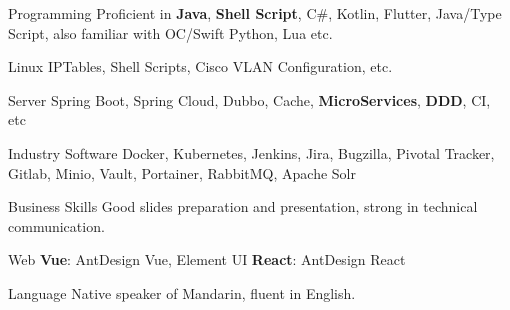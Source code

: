 

\begin{cvskills}

  \cvskill
    {Programming} %
    {Proficient in \textbf{Java},  \textbf{Shell Script}, {C\#}, {Kotlin}, {Flutter}, {Java/Type Script}, also familiar with {OC/Swift} {Python}, Lua etc.} %


  \cvskill
    {Linux} %
    {{IPTables}, {Shell Scripts}, {Cisco VLAN Configuration},   etc. } %


  \cvskill
    {Server} %
    {Spring Boot, Spring Cloud, Dubbo, Cache, \textbf{MicroServices}, \textbf{DDD}, CI, etc } %

  \cvskill
    {Industry Software} %
    { Docker, Kubernetes, Jenkins, Jira, Bugzilla, {Pivotal Tracker}, Gitlab, Minio, Vault, Portainer, RabbitMQ, Apache Solr}%

    
  \cvskill
    {Business Skills} %
    {Good slides preparation and presentation, strong in technical communication.} %

  \cvskill
    {Web} %
    {\textbf{Vue}: AntDesign Vue, Element UI \textbf{React}: AntDesign React } %

  \cvskill
    {Language} %
    {Native speaker of Mandarin, fluent in English.} %
\end{cvskills}
